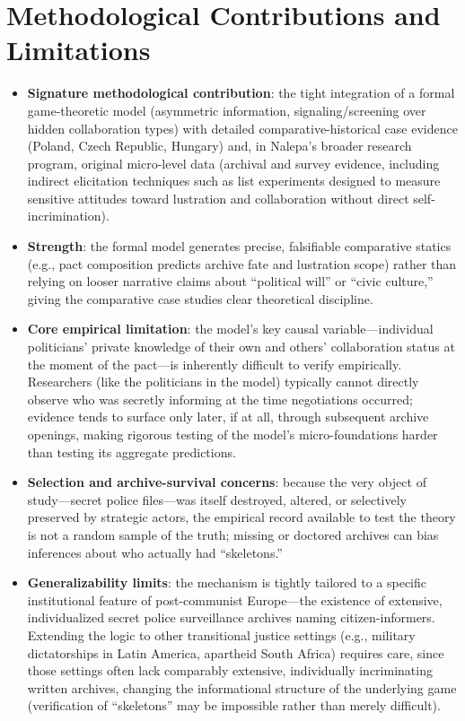 \documentclass[12pt]{article}
\begin{document}
\section{Methodological Contributions and Limitations}

\begin{itemize}[leftmargin=*, itemsep=4pt]
    \item \textbf{Signature methodological contribution}: the tight integration of a formal game-theoretic model (asymmetric information, signaling/screening over hidden collaboration types) with detailed comparative-historical case evidence (Poland, Czech Republic, Hungary) and, in Nalepa's broader research program, original micro-level data (archival and survey evidence, including indirect elicitation techniques such as list experiments designed to measure sensitive attitudes toward lustration and collaboration without direct self-incrimination).
    \item \textbf{Strength}: the formal model generates precise, falsifiable comparative statics (e.g., pact composition predicts archive fate and lustration scope) rather than relying on looser narrative claims about ``political will'' or ``civic culture,'' giving the comparative case studies clear theoretical discipline.
    \item \textbf{Core empirical limitation}: the model's key causal variable---individual politicians' private knowledge of their own and others' collaboration status at the moment of the pact---is inherently difficult to verify empirically. Researchers (like the politicians in the model) typically cannot directly observe who was secretly informing at the time negotiations occurred; evidence tends to surface only later, if at all, through subsequent archive openings, making rigorous testing of the model's micro-foundations harder than testing its aggregate predictions.
    \item \textbf{Selection and archive-survival concerns}: because the very object of study---secret police files---was itself destroyed, altered, or selectively preserved by strategic actors, the empirical record available to test the theory is not a random sample of the truth; missing or doctored archives can bias inferences about who actually had ``skeletons.''
    \item \textbf{Generalizability limits}: the mechanism is tightly tailored to a specific institutional feature of post-communist Europe---the existence of extensive, individualized secret police surveillance archives naming citizen-informers. Extending the logic to other transitional justice settings (e.g., military dictatorships in Latin America, apartheid South Africa) requires care, since those settings often lack comparably extensive, individually incriminating written archives, changing the informational structure of the underlying game (verification of ``skeletons'' may be impossible rather than merely difficult).

\end{itemize}
\end{document}
